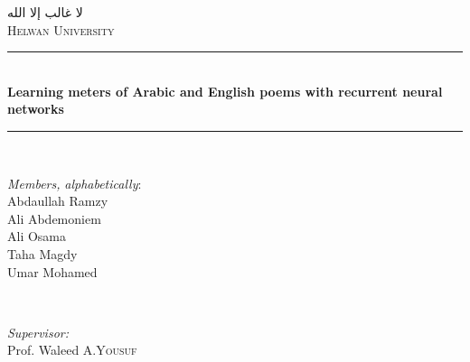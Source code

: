 \documentclass[12pt]{report}
\let\keptmaketitle\maketitle %
\let\maketitle\keptmaketitle %
\begin{document}
%




\begin{titlepage}

\newcommand{\HRule}{\rule{\linewidth}{0.5mm}} %

\center %
 

\textsc{\Large \textarabic{لا غالب إلا الله}}\\[1.9cm] %
\textsc{\LARGE Helwan University}\\[1.5cm] %


\HRule \\[.4cm]
{ \LARGE \bfseries Learning meters of Arabic and English poems with recurrent
neural networks}\\[0.4cm] %
\HRule \\[3cm]
 

\begin{minipage}{0.4\textwidth}
\begin{flushleft} \large
\textit{\Large Members,} \textit{\small alphabetically}:\\

Abdaullah Ramzy\\
Ali Abdemoniem\\
Ali Osama\\
Taha Magdy\\
Umar Mohamed\\
\end{flushleft}
\end{minipage}
~
\begin{minipage}{0.4\textwidth}
\begin{flushright} \large
\textit{\Large Supervisor:} \\
Prof. Waleed A.\textsc{Yousuf} %
\end{flushright}
\end{minipage}\\[4cm]


\end{titlepage}
\end{document}
